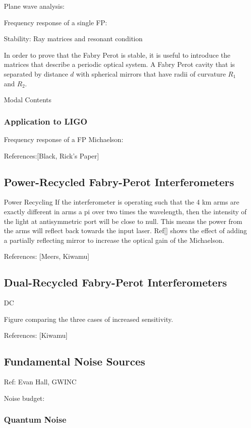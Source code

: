 \documentclass[oneside]{book}
\begin{document}
		Plane wave analysis:
		
		Frequency response of a single FP:
		
		Stability: Ray matrices and resonant condition
		
		In order to prove that the Fabry Perot is stable, it is useful to introduce the matrices that describe a periodic optical system.  A Fabry Perot cavity that is separated by distance $d$ with spherical mirrors that have radii of curvature $R_1$ and $R_2$.
	
		Modal Contents
		
		\subsubsection{Application to LIGO}
		
		
		
		Frequency response of a FP Michaelson:

		References:[Black, Rick's Paper]

		\subsection{Power-Recycled Fabry-Perot Interferometers}
		Power Recycling
		If the interferometer is operating such that the 4 km arms are exactly different in arms a pi over two times the wavelength, then the intensity of the light at antisymmetric port will be close to null.  This means the power from the arms will reflect back towards the input laser.  Ref[] shows the effect of adding a partially reflecting mirror to increase the optical gain of the Michaelson.
		
		
		References: [Meers, Kiwamu]
		
		\subsection{Dual-Recycled Fabry-Perot Interferometers}
		
		DC
		
		Figure comparing the three cases of increased sensitivity.
		
		References: [Kiwamu]
		
		\subsection{Fundamental Noise Sources}
		Ref: Evan Hall, GWINC

		Noise budget:

		\subsubsection{Quantum Noise}
\end{document}
